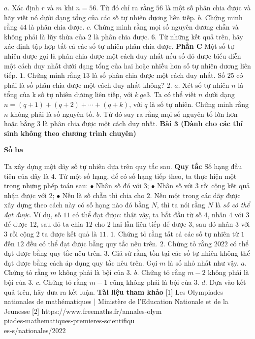 \begin{multicols}{2}
	\vskip 0.1cm
	$a.$ Xác định $r$ và $m$ khi $n=56$. Từ đó chỉ ra rằng $56$ là một số phân chia được và hãy viết nó dưới dạng tổng của các số tự nhiên dương liên tiếp.
	\vskip 0.1cm
	$b.$ Chứng minh rằng $44$ là phân chia được.
	\vskip 0.1cm
	$c.$ Chứng minh rằng mọi  số nguyên dương chẵn và không phải là lũy thừa của $2$ là phân chia được. 
	\vskip 0.1cm
	$6.$ Từ những kết quả trên, hãy xác định tập hợp tất cả các số tự nhiên phân chia được.
	\vskip 0.1cm
	\textbf{\color{cackithi}Phần C}
	\vskip 0.1cm
	Một số tự nhiên được gọi là phân chia được một cách duy nhất nếu số đó được biểu diễn một cách duy nhất dưới dạng tổng của hai hoặc nhiều hơn số tự nhiên dương liên tiếp.
	\vskip 0.1cm
	$1.$ Chứng minh rằng $13$ là số phân chia được một cách duy nhất. Số $25$ có phải là số phân chia được một cách duy nhất không?
	\vskip 0.1cm
	$2.$ $a.$ Xét số tự nhiên $n$ là tổng của k số tự nhiên dương liên tiếp, với $k\ ge3$. Ta có thể viết $n$ dưới dạng  $n=(q+1)+(q+2)+\cdots+(q+k)$, với $q$ là số tự nhiên. Chứng minh rằng $n$ không phải là số nguyên tố.
	\vskip 0.1cm
	$b$. Từ đó suy ra rằng mọi số nguyên tố lớn hơn hoặc bằng $3$ là phân chia được một cách duy nhất.
	\vskip 0.1cm
	\textbf{\color{cackithi}Bài $\pmb{3}$ (Dành cho các thí sinh không theo chương trình chuyên)}
	\begin{center}
		\textbf{\color{cackithi}Số ba}
	\end{center}
	Ta xây dựng một dãy số tự nhiên dựa trên quy tắc sau.
	\vskip 0.1cm
	\textbf{\color{cackithi}Quy tắc}
	\vskip 0.1cm
	Số hạng đầu tiên của dãy là $4$.
	\vskip 0.1cm
	Từ một số hạng, để có số hạng tiếp theo, ta thực hiện một trong những phép toán sau:
	\vskip 0.1cm 
	$\bullet$ Nhân số đó với $3$;
	\vskip 0.1cm
	$\bullet$ Nhân số với $3$ rồi cộng kết quả nhận được với $2$;
	\vskip 0.1cm
	$\bullet$ Nếu là số chẵn thì chia cho $2$.
	\vskip 0.1cm
	Nếu một trong các dãy được xây dựng theo cách này có số hạng nào đó bằng $N$, thì ta nói rằng $N$ là \textit{số có thể đạt được}.
	\vskip 0.1cm 
	Ví dụ, số $11$ có thể đạt được: thật vậy, ta bắt đầu từ số $4$, nhân $4$ với $3$ để được $12$, sau đó ta chia $12$ cho $2$ hai lần liên tiếp để được $3$, sau đó nhân $3$ với $3$ rồi cộng $2$ ta được kết quả là $11$.
	\vskip 0.1cm 
	$1.$ Chứng tỏ rằng tất cả các số tự nhiên từ $1$ đến $12$ đều có thể đạt được bằng quy tắc nêu trên. 
	\vskip 0.1cm
	$2.$ Chứng tỏ rằng $2022$ có thể đạt được bằng quy tắc nêu trên. 
	\vskip 0.1cm
	$3.$ Giả sử rằng tồn tại các số tự nhiên không thể đạt được bằng cách áp dụng quy tắc nêu trên. Gọi $m$ là số nhỏ nhất như vậy.
	\vskip 0.1cm
	$a.$ Chứng tỏ rằng $m$ không phải là bội của $3$.
	\vskip 0.1cm
	$b.$ Chứng tỏ rằng $m-2$ không phải là bội của $3$.
	\vskip 0.1cm
	$c.$ Chứng tỏ rằng $m-1$ cũng không phải là bội của $3$.
	\vskip 0.1cm
	$d.$ Dựa vào kết quả trên, hãy đưa ra kết luận. 
	\vskip 0.1cm
	\textbf{\color{cackithi}Tài liệu tham khảo}
	\vskip 0.1cm
	[$1$] Les Olympiades nationales de mathématiques | Ministère de l'Education Nationale et de la Jeunesse
	\vskip 0.1cm
	[$2$] https://www.freemaths.fr/annales-olym\\piades-mathematiques-premieres-scientifiqu\\es-s/nationales/2022
\end{multicols}
